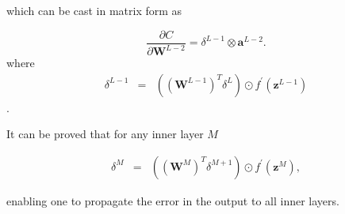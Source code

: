 \documentclass[11pt,onecolumn]{article}
\begin{document}
which can be cast in matrix form as 

\begin{equation}
    \frac{\partial C}{\partial \mathbf{W}^{L-2}} = \delta^{L-1} \otimes \mathbf{a}^{L-2}. 
\end{equation}
where
\begin{eqnarray}
    \delta^{L-1} &=& \left(\left(\mathbf{W}^{L-1}\right)^{T}\delta^{L} \right) \odot f^{'}\left( \mathbf{z}^{L-1}\right) 
\end{eqnarray}.

It can be proved that for any inner layer $M$

\begin{eqnarray}
    \delta^{M} &=& \left(\left(\mathbf{W}^{M}\right)^{T}\delta^{M+1} \right) \odot f^{'}\left( \mathbf{z}^{M}\right), 
\end{eqnarray}

enabling one to propagate the error in the output to all inner layers. 
\end{document}
